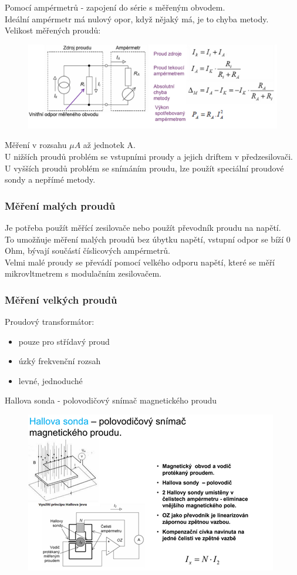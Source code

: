 Pomocí ampérmetrů - zapojení do série s měřeným obvodem.\\
Ideální ampérmetr má nulový opor, když nějaký má, je to chyba metody.\\
Velikost měřených proudů:
\begin{figure}[H]
    \includegraphics*[scale = 1.2]{images/Imereni.png}
\end{figure}
Měření v rozsahu $\mu A$ až jednotek A.\\
U nižších proudů problém se vstupními proudy a jejich driftem v předzesilovači.\\
U vyšších proudů problém se snímáním proudu, lze použít speciální proudové sondy a nepřímé metody.\\
\newpage

\subsubsection*{Měření malých proudů}
Je potřeba použít měřící zesilovače nebo použít převodník proudu na napětí.\\
To umožňuje měření malých proudů bez úbytku napětí, vstupní odpor se bíží 0 Ohm, bývají součástí číslicových ampérmetrů.\\
Velmi malé proudy se převádí pomocí velkého odporu napětí, které se měří mikrovltmetrem s modulačním zesilovačem.\\
\subsubsection*{Měření velkých proudů}
Proudový transformátor:
\begin{itemize}
    \item pouze pro střídavý proud
    \item úzký frekvenční rozsah
    \item levné, jednoduché
\end{itemize}
Hallova sonda - polovodičový snímač magnetického proudu
\begin{figure}[H]
    \includegraphics*[scale = 1]{images/hallova_sonda.png}
\end{figure}

